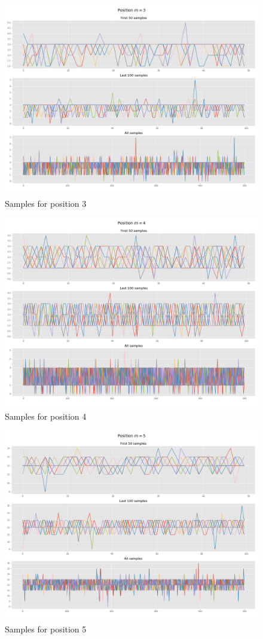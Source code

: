 \documentclass[]{article}
\begin{document}
	\begin{figure}[H]
		\begin{center}
			
			\includegraphics[width=.5\textwidth]{task4/figures/T_2_4/Q2/convergence_pos3.png}
			\caption*{Samples for position 3}
		\end{center}
	\end{figure}
	
	\begin{figure}[H]
		\begin{center}
			
			\includegraphics[width=.5\textwidth]{task4/figures/T_2_4/Q2/convergence_pos4.png}
			\caption*{Samples for position 4}
		\end{center}
	\end{figure}
	
	\begin{figure}[H]
		\begin{center}
			
			\includegraphics[width=.5\textwidth]{task4/figures/T_2_4/Q2/convergence_pos5.png}
			\caption*{Samples for position 5}
		\end{center}
	\end{figure}
	
\end{document}
